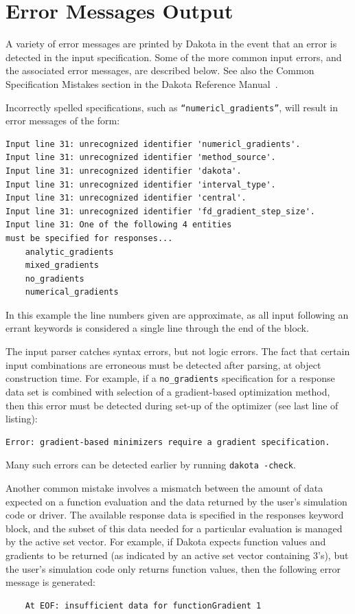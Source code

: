 \section{Error Messages Output}\label{output:error}

A variety of error messages are printed by Dakota in the event that an
error is detected in the input specification. Some of the more common
input errors, and the associated error messages, are described below.
See also the Common Specification Mistakes section in the Dakota
Reference Manual~\cite{RefMan}.

Incorrectly spelled specifications, such as 
\texttt{``numericl\_gradients''}, will result in error messages of the form:
\begin{small}
\begin{verbatim}
Input line 31: unrecognized identifier 'numericl_gradients'.
Input line 31: unrecognized identifier 'method_source'.
Input line 31: unrecognized identifier 'dakota'.
Input line 31: unrecognized identifier 'interval_type'.
Input line 31: unrecognized identifier 'central'.
Input line 31: unrecognized identifier 'fd_gradient_step_size'.
Input line 31: One of the following 4 entities
must be specified for responses...
	analytic_gradients
	mixed_gradients
	no_gradients
	numerical_gradients
\end{verbatim}
\end{small}
In this example the line numbers given are approximate, as all input
following an errant keywords is considered a single line through the
end of the block.

The input parser catches syntax errors, but not logic errors. The fact
that certain input combinations are erroneous must be detected after
parsing, at object construction time. For example, if a
\texttt{no\_gradients} specification for a response data set is
combined with selection of a gradient-based optimization method, then
this error must be detected during set-up of the optimizer (see last
line of listing):
\begin{small}
\begin{verbatim}
Error: gradient-based minimizers require a gradient specification.
\end{verbatim}
\end{small}
Many such errors can be detected earlier by running \texttt{dakota
  -check}.

Another common mistake involves a mismatch between the amount of data
expected on a function evaluation and the data returned by the user's
simulation code or driver. The available response data is specified in
the responses keyword block, and the subset of this data needed for a
particular evaluation is managed by the active set vector. For
example, if Dakota expects function values and gradients to be
returned (as indicated by an active set vector containing 3's), but
the user's simulation code only returns function values, then the
following error message is generated:
\begin{small}
\begin{verbatim}
    At EOF: insufficient data for functionGradient 1
\end{verbatim}
\end{small}

